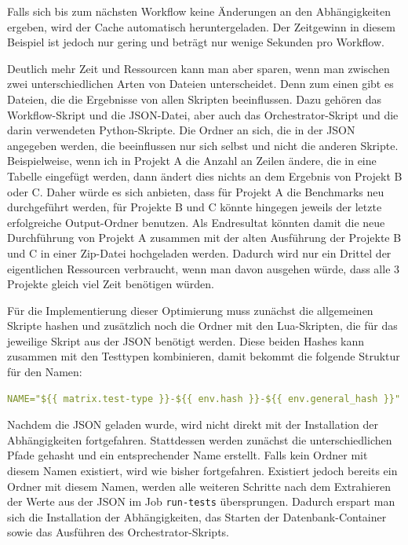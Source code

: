 \vspace{-5pt}

\vspace{-5pt}

Falls sich bis zum nächsten Workflow keine Änderungen an den Abhängigkeiten ergeben, wird der Cache automatisch heruntergeladen.
Der Zeitgewinn in diesem Beispiel ist jedoch nur gering und beträgt nur wenige Sekunden pro Workflow.

Deutlich mehr Zeit und Ressourcen kann man aber sparen, wenn man zwischen zwei unterschiedlichen Arten von Dateien unterscheidet.
Denn zum einen gibt es Dateien, die die Ergebnisse von allen Skripten beeinflussen.
Dazu gehören das Workflow-Skript und die JSON-Datei, aber auch das Orchestrator-Skript und die darin verwendeten Python-Skripte.
Die Ordner an sich, die in der JSON angegeben werden, die beeinflussen nur sich selbst und nicht die anderen Skripte.
Beispielweise, wenn ich in Projekt A die Anzahl an Zeilen ändere, die in eine Tabelle eingefügt werden, dann ändert dies nichts an dem Ergebnis von Projekt B oder C\@.
Daher würde es sich anbieten, dass für Projekt A die Benchmarks neu durchgeführt werden, für Projekte B und C könnte hingegen jeweils der letzte erfolgreiche Output-Ordner benutzen.
Als Endresultat könnten damit die neue Durchführung von Projekt A zusammen mit der alten Ausführung der Projekte B und C in einer Zip-Datei hochgeladen werden.
Dadurch wird nur ein Drittel der eigentlichen Ressourcen verbraucht, wenn man davon ausgehen würde, dass alle 3 Projekte gleich viel Zeit benötigen würden.

Für die Implementierung dieser Optimierung muss zunächst die allgemeinen Skripte hashen und zusätzlich noch die Ordner mit den Lua-Skripten, die für das jeweilige Skript aus der JSON benötigt werden.
Diese beiden Hashes kann zusammen mit den Testtypen kombinieren, damit bekommt die folgende Struktur für den Namen:

\vspace{-5pt}
\begin{lstlisting}[language=yaml,label={lst:tools-hash_name},style=custom_daniel]
NAME="${{ matrix.test-type }}-${{ env.hash }}-${{ env.general_hash }}"
\end{lstlisting}
\vspace{-5pt}

Nachdem die JSON geladen wurde, wird nicht direkt mit der Installation der Abhängigkeiten fortgefahren.
Stattdessen werden zunächst die unterschiedlichen Pfade gehasht und ein entsprechender Name erstellt.
Falls kein Ordner mit diesem Namen existiert, wird wie bisher fortgefahren.
Existiert jedoch bereits ein Ordner mit diesem Namen, werden alle weiteren Schritte nach dem Extrahieren der Werte aus der JSON im Job \texttt{run-tests} übersprungen.
Dadurch erspart man sich die Installation der Abhängigkeiten, das Starten der Datenbank-Container sowie das Ausführen des Orchestrator-Skripts.

